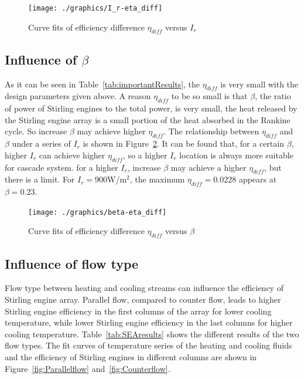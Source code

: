 \documentclass{article}
\begin{document}
\noindent \begin{figure}[htbp]
\begin{center}
	\texttt{[image: ./graphics/I\_r-eta\_diff]}
	\caption{Curve fits of efficiency difference $\eta_{diff}$ versus $I_r$}
	\label{fig:I_r-eta_diff}
\end{center}
\end{figure}

\subsection{Influence of $\beta$}

As it can be seen in Table~\ref{tab:importantResults}, the $\eta_{diff}$ is very small with the design parameters given above. A reason $\eta_{diff}$ to be so small is that $\beta$, the ratio of power of Stirling engines to the total power, is very small, the heat released by the Stirling engine array is a small portion of the heat absorbed in the Rankine cycle. So increase $\beta$ may achieve higher $\eta_{diff}$. The relationship between $\eta_{diff}$ and $\beta$ under a series of $I_r$ is shown in Figure~\ref{fig:beta-eta_diff}. It can be found that, for a certain $\beta$, higher $I_r$ can achieve higher $\eta_{diff}$, so a higher $I_r$ location is always more suitable for cascade system. for a higher $I_r$, increase $\beta$ may achieve a higher $\eta_{diff}$, but there is a limit. For $I_r=900$W/m$^2$, the maximum $\eta_{diff}=0.0228$ appears at $\beta=0.23$.

\noindent \begin{figure}[H]
\begin{center}
	\texttt{[image: ./graphics/beta-eta\_diff]}
	\caption{Curve fits of efficiency difference $\eta_{diff}$ versus $\beta$}
	\label{fig:beta-eta_diff}
\end{center}
\end{figure}

\subsection{Influence of flow type}

Flow type between heating and cooling streams can influence the efficiency of Stirling engine array. Parallel flow, compared to counter flow, leads to higher Stirling engine efficiency in the first columns of the array for lower cooling temperature, while lower Stirling engine efficiency in the last columns for higher cooling temperature. Table~\ref{tab:SEAresults} shows the different results of the two flow types. The fit curves of temperature series of the heating and cooling fluids and the efficiency of Stirling engines in different columns are shown in Figure~\ref{fig:Parallelflow} and~\ref{fig:Counterflow}.
\end{document}
